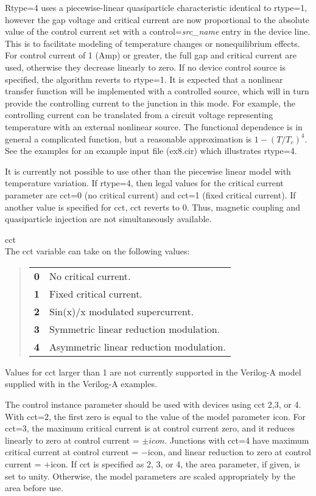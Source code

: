 \begin{description}
{\vt Rtype=4} uses a piecewise-linear quasiparticle characteristic
identical to {\vt rtype=1}, however the gap voltage and critical
current are now proportional to the absolute value of the control
current set with a {\vt control=}{\it src\_name} entry in the device
line.  This is to facilitate modeling of temperature changes or
nonequilibrium effects.  For control current of 1 (Amp) or greater,
the full gap and critical current are used, otherwise they decrease
linearly to zero.  If no device control source is specified, the
algorithm reverts to {\vt rtype=1}.  It is expected that a nonlinear
transfer function will be implemented with a controlled source, which
will in turn provide the controlling current to the junction in this
mode.  For example, the controlling current can be translated from a
circuit voltage representing temperature with an external nonlinear
source.  The functional dependence is in general a complicated
function, but a reasonable approximation is $1 - (T/T_c)^4$.  See the
examples for an example input file ({\vt ex8.cir}) which illustrates
{\vt rtype=4}.

It is currently not possible to use other than the piecewise linear
model with temperature variation.  If {\vt rtype=4}, then legal values
for the critical current parameter are {\vt cct=0} (no critical
current) and {\vt cct=1} (fixed critical current).  If another value
is specified for {\vt cct}, {\vt cct} reverts to 0.  Thus, magnetic
coupling and quasiparticle injection are not simultaneously available.

\item{\vt cct}\\
The {\vt cct} variable can take on the following values:
\begin{quote}
\begin{tabular}{ll}
\bf 0 & No critical current.\\
\bf 1 & Fixed critical current.\\
\bf 2 & Sin(x)/x modulated supercurrent.\\
\bf 3 & Symmetric linear reduction modulation.\\
\bf 4 & Asymmetric linear reduction modulation.\\
\end{tabular}
\end{quote}

Values for {\vt cct} larger than 1 are not currently supported in the
Verilog-A model supplied with {\WRspice} in the Verilog-A examples.

The {\vt control} instance parameter should be used with devices using
{\vt cct} 2,3, or 4.  With {\vt cct=2}, the first zero is equal to the
value of the model parameter {\vt icon}.  For {\vt cct=3}, the maximum
critical current is at control current zero, and it reduces linearly
to zero at control current = $\pm icon$.  Junctions with {\vt cct=4}
have maximum critical current at control current = $-${\vt icon}, and
linear reduction to zero at control current = $+${\vt icon}.  If {\vt
cct} is specified as 2, 3, or 4, the area parameter, if given, is set
to unity.  Otherwise, the model parameters are scaled appropriately by
the area before use.


\end{description}
